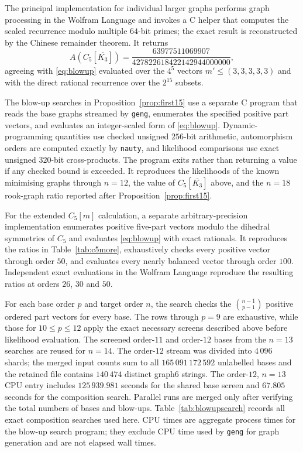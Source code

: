 \documentclass[11pt]{article}
\theoremstyle{definition}
\begin{document}
The principal implementation for individual larger graphs performs graph
processing in the Wolfram Language and invokes a C helper that computes the
scaled recurrence modulo multiple $64$-bit primes; the exact result is
reconstructed by the Chinese remainder theorem.  It returns
\[
A(C_5[\overline{K_3}])
=\frac{63977511069907}{427822618422142944000000},
\]
agreeing with \eqref{eq:blowup} evaluated over the $4^5$ vectors
$m'\le(3,3,3,3,3)$ and with the direct rational recurrence over the $2^{15}$
subsets.

The blow-up searches in Proposition~\ref{prop:first15} use a separate C
program that reads the base graphs streamed by \texttt{geng}, enumerates the
specified positive part vectors, and evaluates an integer-scaled form of
\eqref{eq:blowup}.  Dynamic-programming quantities use checked unsigned
$256$-bit arithmetic, automorphism orders are computed exactly by
\texttt{nauty}, and likelihood comparisons use exact unsigned $320$-bit
cross-products.  The program exits rather than returning a value if any
checked bound is exceeded.  It reproduces the likelihoods of the known
minimising graphs through $n=12$, the value of
$C_5[\overline{K_3}]$ above, and the $n=18$ rook-graph ratio reported after
Proposition~\ref{prop:first15}.

For the extended $C_5[m]$ calculation, a separate arbitrary-precision
implementation enumerates positive five-part vectors modulo the dihedral
symmetries of $C_5$ and evaluates \eqref{eq:blowup} with exact rationals.  It
reproduces the ratios in Table~\ref{tab:c5more}, exhaustively checks every
positive vector through order $50$, and evaluates every nearly balanced
vector through order $100$.  Independent exact evaluations in the Wolfram
Language reproduce the resulting ratios at orders $26$, $30$ and $50$.

For each base order $p$ and target order $n$, the search checks the
$\binom{n-1}{p-1}$ positive ordered part vectors for every base.  The rows
through $p=9$ are exhaustive, while those for $10\le p\le12$ apply the exact
necessary screens described above before likelihood evaluation.  The
screened order-$11$ and order-$12$ bases from the $n=13$ searches are reused
for $n=14$.  The order-$12$ stream was divided into $4\,096$ shards; the
merged input counts sum to all $165\,091\,172\,592$ unlabelled bases and the
retained file contains $140\,474$ distinct graph6 strings.  The order-$12$,
$n=13$ CPU entry includes $125\,939.981$ seconds for the shared base screen
and $67.805$ seconds for the composition search.
Parallel runs are merged only after verifying the total numbers of bases and
blow-ups.  Table~\ref{tab:blowupsearch} records
all exact composition searches used here.  CPU times are aggregate
process times for the blow-up search program; they exclude CPU time used by
\texttt{geng} for graph generation and are not elapsed wall times.
\end{document}
